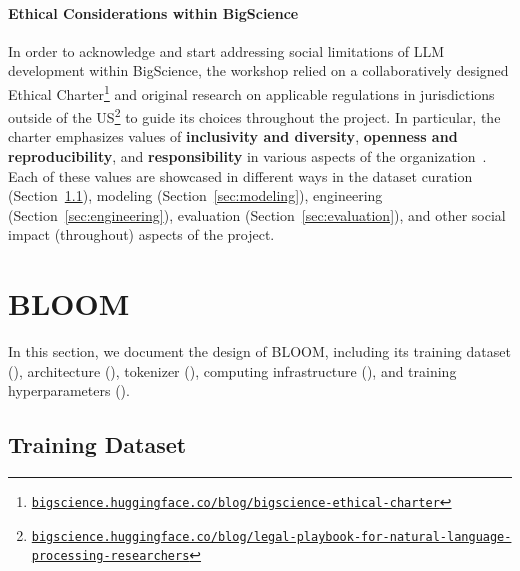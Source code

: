 \documentclass[twoside,11pt]{article}
\begin{document}
\paragraph{Ethical Considerations within BigScience}
In order to acknowledge and start addressing social limitations of LLM development within BigScience, the workshop relied on a collaboratively designed Ethical Charter\footnote{\href{https://bigscience.huggingface.co/blog/bigscience-ethical-charter}{\texttt{bigscience.huggingface.co/blog/bigscience-ethical-charter}}} and original research on applicable regulations in jurisdictions outside of the US\footnote{\href{https://bigscience.huggingface.co/blog/legal-playbook-for-natural-language-processing-researchers}{\texttt{bigscience.huggingface.co/blog/legal-playbook-for-natural-language-processing-researchers}}} to guide its choices throughout the project. In particular, the charter emphasizes values of \textbf{inclusivity and diversity}, \textbf{openness and reproducibility}, and \textbf{responsibility} in various aspects of the organization~\citep{bigscience2022org}. Each of these values are showcased in different ways in the dataset curation (Section~\ref{sec:dataset}), modeling (Section~\ref{sec:modeling}), engineering (Section~\ref{sec:engineering}), evaluation (Section~\ref{sec:evaluation}), and other social impact (throughout) aspects of the project.

\section{BLOOM}

In this section, we document the design of BLOOM, including its training dataset (), architecture (), tokenizer (), computing infrastructure (), and training hyperparameters ().

\subsection{Training Dataset}
\label{sec:dataset}
\end{document}
